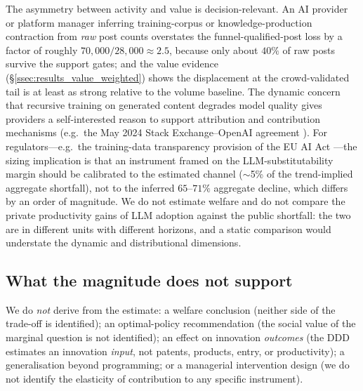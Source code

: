 The asymmetry between activity and value is decision-relevant.
An AI provider or platform manager inferring training-corpus or
knowledge-production contraction from \emph{raw} post counts
overstates the funnel-qualified-post loss by a factor of roughly
$70{,}000/28{,}000\approx2.5$, because only about $40\%$ of raw
posts survive the support gates; and the value evidence
(\S\ref{ssec:results_value_weighted}) shows the displacement at
the crowd-validated tail is at least as strong relative to the
volume baseline. The dynamic concern that recursive training on
generated content degrades model quality
\citep{shumailov2024curse} gives providers a self-interested
reason to support attribution and contribution mechanisms (e.g.\
the May 2024 Stack Exchange--OpenAI agreement
\citep{stackexchange_openai_2024}). For regulators---e.g.\ the
training-data transparency provision of the EU AI Act
\citep{eu_ai_act_2024}---the sizing implication is that an
instrument framed on the LLM-substitutability margin should be
calibrated to the estimated channel ($\sim$5\% of the
trend-implied aggregate shortfall), not to the inferred
$65$--$71\%$ aggregate decline, which differs by an order of
magnitude. We do not estimate welfare and do not compare the
private productivity gains of LLM adoption against the public
shortfall: the two are in different units with different
horizons, and a static comparison would understate the dynamic
and distributional dimensions.

\subsection{What the magnitude does not
support}\label{ssec:pol_not_supported}

We do \emph{not} derive from the estimate: a welfare conclusion
(neither side of the trade-off is identified); an optimal-policy
recommendation (the social value of the marginal question is not
identified); an effect on innovation \emph{outcomes} (the DDD
estimates an innovation \emph{input}, not patents, products,
entry, or productivity); a generalisation beyond programming;
or a managerial intervention design (we do not identify the
elasticity of contribution to any specific instrument).

